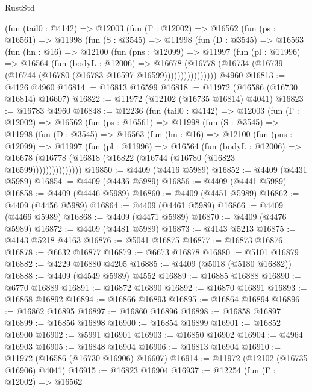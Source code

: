 \begin{lexlean}{RustStd}
\begin{coremodule}
      (fun (tail0 : @4142) =>
      @12003
        (fun (Γ : @12002) =>
        @16562
          (fun (ps : @16561) =>
          @11998
            (fun (S : @3545) =>
            @11998
              (fun (D : @3545) =>
              @16563
                (fun (hn : @16) =>
                @12100
                  (fun (pns : @12099) =>
                  @11997
                    (fun (pl : @11996) =>
                    @16564
                      (fun (bodyL : @12006) =>
                      @16678
                        (@16778
                          (@16734 (@16739 (@16744 (@16780 (@16783 @16597 @16599))))))))))))))))
    @4960
@16813 := @4126 @4960
@16814 := @16813 @16599
@16818 := @11972 (@16586 (@16730 @16814) @16607)
@16822 := @11972 (@12102 (@16735 @16814) @4041)
@16823 := @16783 @4960
@16848 := @12236
    (fun (tail0 : @4142) =>
    @12003
      (fun (Γ : @12002) =>
      @16562
        (fun (ps : @16561) =>
        @11998
          (fun (S : @3545) =>
          @11998
            (fun (D : @3545) =>
            @16563
              (fun (hn : @16) =>
              @12100
                (fun (pns : @12099) =>
                @11997
                  (fun (pl : @11996) =>
                  @16564
                    (fun (bodyL : @12006) =>
                    @16678 (@16778 (@16818 (@16822 (@16744 (@16780 (@16823 @16599)))))))))))))))
@16850 := @4409 (@4416 @5989)
@16852 := @4409 (@4431 @5989)
@16854 := @4409 (@4436 @5989)
@16856 := @4409 (@4441 @5989)
@16858 := @4409 (@4446 @5989)
@16860 := @4409 (@4451 @5989)
@16862 := @4409 (@4456 @5989)
@16864 := @4409 (@4461 @5989)
@16866 := @4409 (@4466 @5989)
@16868 := @4409 (@4471 @5989)
@16870 := @4409 (@4476 @5989)
@16872 := @4409 (@4481 @5989)
@16873 := @4143 @5213
@16875 := @4143 @5218 @4163
@16876 := @5041 @16875
@16877 := @16873 @16876
@16878 := @6632 @16877
@16879 := @6673 @16878
@16880 := @5101 @16879
@16882 := @4229 @16880 @4205
@16885 := @4409 (@5018 (@5180 @16882))
@16888 := @4409 (@4549 @5989) @4552
@16889 := @16885 @16888
@16890 := @6770 @16889
@16891 := @16872 @16890
@16892 := @16870 @16891
@16893 := @16868 @16892
@16894 := @16866 @16893
@16895 := @16864 @16894
@16896 := @16862 @16895
@16897 := @16860 @16896
@16898 := @16858 @16897
@16899 := @16856 @16898
@16900 := @16854 @16899
@16901 := @16852 @16900
@16902 := @5991 @16901
@16903 := @16850 @16902
@16904 := @4964 @16903
@16905 := @16848 @16904
@16906 := @16813 @16904
@16910 := @11972 (@16586 (@16730 @16906) @16607)
@16914 := @11972 (@12102 (@16735 @16906) @4041)
@16915 := @16823 @16904
@16937 := @12254
    (fun (Γ : @12002) =>
    @16562

\end{coremodule}
\end{lexlean}
